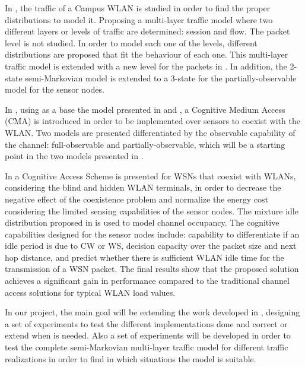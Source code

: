 In \cite{Campus-WLAN}, the traffic of a Campus \acs{WLAN} is studied in order to find the proper distributions to model it. Proposing a multi-layer traffic model where two different layers or levels of traffic are determined: session and flow. The packet level is not studied. In order to model each one of the levels, different distributions are proposed that fit the behaviour of each one. This multi-layer traffic model is extended with a new level for the packets in \cite{marcello}. In addition, the 2-state semi-Markovian model is extended to a 3-state for the partially-observable model for the sensor nodes. 

In \cite{CMA-Exp}, using as a base the model presented in \cite{ActiveMeasure} and \cite{DSA-Emp}, a Cognitive Medium Access (\acs{CMA}) is introduced in order to be implemented over sensors to coexist with the \acs{WLAN}. Two models are presented differentiated by the observable capability of the channel: full-observable and partially-observable, which will be a starting point in the two models presented in \cite{ioannis}.

In \cite{ioannis} a Cognitive Access Scheme is presented for \acs{WSN}s that coexist with \acs{WLAN}s, considering the blind and hidden \acs{WLAN} terminals, in order to decrease the negative effect of the coexistence problem and normalize the energy cost considering the limited sensing capabilities of the sensor nodes. The mixture idle distribution proposed in \cite{DSA-Emp} is used to model channel occupancy. The cognitive capabilities designed for the sensor nodes include: capability to differentiate if an idle period is due to \acs{CW} or \acs{WS}, decision capacity over the packet size and next hop distance, and predict whether there is sufficient \acs{WLAN} idle time for the transmission of a \acs{WSN} packet. The final results show that the proposed solution achieves a significant gain in performance compared to the traditional channel access solutions for typical \acs{WLAN} load values.

In our project, the main goal will be extending the work developed in \cite{marcello}, designing a set of experiments to test the different implementations done and correct or extend when is needed. Also a set of experiments will be developed in order to test the complete semi-Markovian multi-layer traffic model for different traffic realizations in order to find in which situations the model is suitable.